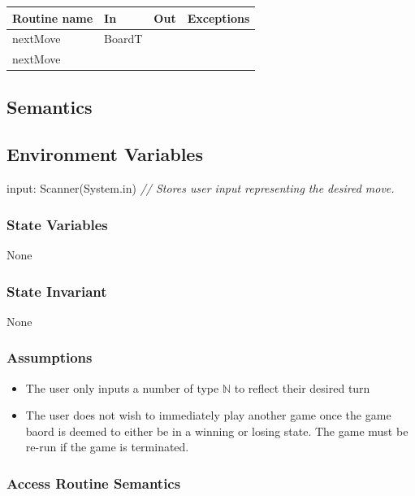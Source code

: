 \documentclass[12pt]{article}
\begin{document}
\begin{tabular}{| l | l | l | p{4.7cm} |}
\hline
\textbf{Routine name} & \textbf{In} & \textbf{Out} & \textbf{Exceptions}\\
\hline
nextMove & BoardT & & ~ \\
\hline
nextMove & ~ & & ~ \\
\hline
\end{tabular}

\subsection* {Semantics}

\subsection*{Environment Variables}

input: Scanner(System.in) \qquad \textit{// Stores user input representing the desired move.}

\subsubsection* {State Variables}

None

\subsubsection* {State Invariant}

None

\subsubsection* {Assumptions}
\begin{itemize}
\item The user only inputs a number of type $\mathbb{N}$ to reflect their desired turn
\item The user does not wish to immediately play another game once the game baord is deemed to either be in a winning or losing state. The game must be re-run if the game is terminated.
\end{itemize}
\subsubsection* {Access Routine Semantics}
\end{document}
